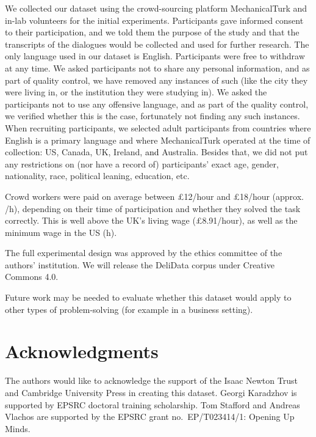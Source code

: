 \documentclass[acmsmall,manuscript,screen]{acmart}
\newcommand\newtext[1]{\textcolor{black}{#1}}
\begin{document}
We collected our dataset using the crowd-sourcing platform MechanicalTurk and in-lab volunteers for the initial experiments. Participants gave informed consent to their participation, and we told them the purpose of the study and that the transcripts of the dialogues would be collected and used for further research. The only language used in our dataset is English. Participants were free to withdraw at any time. We asked participants not to share any personal information, and as part of quality control, we have removed any instances of such (like the city they were living in, or the institution they were studying in). We asked the participants not to use any offensive language, and as part of the quality control, we verified whether this is the case, fortunately not finding any such instances. When recruiting participants, we selected adult participants from countries where English is a primary language and where MechanicalTurk operated at the time of collection: US, Canada, UK, Ireland, \newtext{and} Australia. Besides that, we did not put any restrictions on (nor have a record of) participants' exact age, gender, nationality, race, political leaning, education, etc. 


Crowd workers were paid on average between £12/hour and £18/hour (approx. /h), depending on their time of participation and whether they solved the task correctly. This is well above the UK's living wage (£8.91/hour), as well as the minimum wage in the US (\/h).

The full experimental design was approved by the ethics committee of the authors' institution. 
We will release the DeliData corpus under Creative Commons 4.0. 

\par

Future work may be needed to evaluate whether this dataset would apply to other types of problem-solving (for example in a business setting).




\section*{Acknowledgments}

The authors would like to acknowledge the support of the Isaac Newton Trust and Cambridge University Press in creating this dataset. Georgi Karadzhov is supported by EPSRC doctoral training scholarship. Tom Stafford and Andreas Vlachos are supported by the EPSRC grant no.\ EP/T023414/1: Opening Up Minds.
\end{document}
